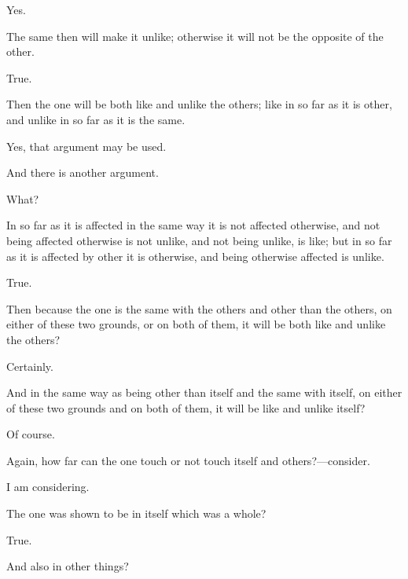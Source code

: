 \documentclass[11pt,letter]{article}
\begin{document}
\par  Yes.

\par  The same then will make it unlike; otherwise it will not be the opposite of the other.

\par  True.

\par  Then the one will be both like and unlike the others; like in so far as it is other, and unlike in so far as it is the same.

\par  Yes, that argument may be used.

\par  And there is another argument.

\par  What?

\par  In so far as it is affected in the same way it is not affected otherwise, and not being affected otherwise is not unlike, and not being unlike, is like; but in so far as it is affected by other it is otherwise, and being otherwise affected is unlike.

\par  True.

\par  Then because the one is the same with the others and other than the others, on either of these two grounds, or on both of them, it will be both like and unlike the others?

\par  Certainly.

\par  And in the same way as being other than itself and the same with itself, on either of these two grounds and on both of them, it will be like and unlike itself?

\par  Of course.

\par  Again, how far can the one touch or not touch itself and others?—consider.

\par  I am considering.

\par  The one was shown to be in itself which was a whole?

\par  True.

\par  And also in other things?
\end{document}
